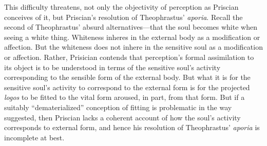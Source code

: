 \documentclass[12pt]{article}
\begin{document}
This difficulty threatens, not only the objectivity of perception as Priscian conceives of it, but Priscian's resolution of Theophrastus' \emph{aporia}. Recall the second of Theophrastus' absurd alternatives---that the soul becomes white when seeing a white thing. Whiteness inheres in the external body as a modification or affection. But the whiteness does not inhere in the sensitive soul as a modification or affection. Rather, Prisician contends that perception's formal assimilation to its object is to be understood in terms of the sensitive soul's activity corresponding to the sensible form of the external body. But what it is for the sensitive soul's activity to correspond to the external form is for the projected \emph{logos} to be fitted to the vital form aroused, in part, from that form. But if a suitably ``dematerialized'' conception of fitting is problematic in the way suggested, then Priscian lacks a coherent account of how the soul's activity corresponds to external form, and hence his resolution of Theophrastus' \emph{aporia} is incomplete at best.






\end{document}
